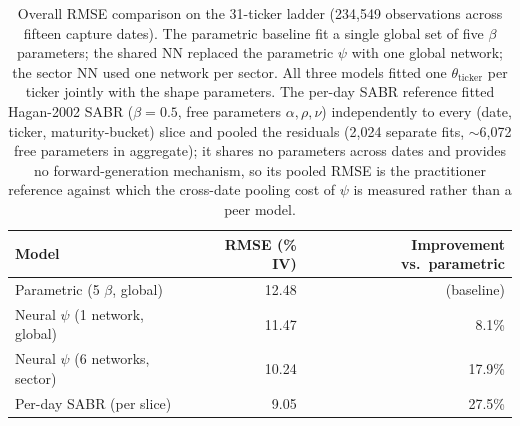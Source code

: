 \begin{table}[ht]
\centering
\caption{Overall RMSE comparison on the 31-ticker ladder (234{,}549 observations across fifteen capture dates). The parametric baseline fit a single global set of five $\beta$ parameters; the shared NN replaced the parametric $\psi$ with one global network; the sector NN used one network per sector. All three models fitted one $\theta_{\text{ticker}}$ per ticker jointly with the shape parameters. The per-day SABR reference fitted Hagan-2002 SABR ($\beta = 0.5$, free parameters $\alpha,\rho,\nu$) independently to every (date, ticker, maturity-bucket) slice and pooled the residuals (2{,}024 separate fits, $\sim$6{,}072 free parameters in aggregate); it shares no parameters across dates and provides no forward-generation mechanism, so its pooled RMSE is the practitioner reference against which the cross-date pooling cost of $\psi$ is measured rather than a peer model.}\label{tab:three_way}
\begin{tabular}{lrr}
\toprule
Model & RMSE (\% IV) & Improvement vs.\ parametric \\
\midrule
Parametric (5 $\beta$, global)     & 12.48 & (baseline) \\
Neural $\psi$ (1 network, global)  & 11.47 & 8.1\% \\
Neural $\psi$ (6 networks, sector) & 10.24 & 17.9\% \\
Per-day SABR (per slice)           & 9.05 & 27.5\% \\
\bottomrule
\end{tabular}
\end{table}

